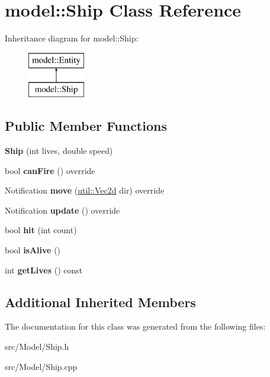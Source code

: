 \hypertarget{classmodel_1_1_ship}{}\section{model\+:\+:Ship Class Reference}
\label{classmodel_1_1_ship}
Inheritance diagram for model\+:\+:Ship\+:\begin{figure}[H]
\begin{center}
\leavevmode
\includegraphics[height=2.000000cm]{d4/d26/classmodel_1_1_ship}
\end{center}
\end{figure}
\subsection*{Public Member Functions}
\begin{DoxyCompactItemize}
\item 
\mbox{\label{classmodel_1_1_ship_ac81fa3e3e9c7e200adeb065ff4f02897}} 
{\bfseries Ship} (int lives, double speed)
\item 
\mbox{\label{classmodel_1_1_ship_a2ee9e5ff45ede55050a194762185a316}} 
bool {\bfseries can\+Fire} () override
\item 
\mbox{\label{classmodel_1_1_ship_ac176e59e40b53bbfd9d19ce23f65dee4}} 
Notification {\bfseries move} (\mbox{\hyperlink{classutil_1_1_vec2}{util\+::\+Vec2d}} dir) override
\item 
\mbox{\label{classmodel_1_1_ship_a2912180cd7f2614e849ef3bb4b66bfa7}} 
Notification {\bfseries update} () override
\item 
\mbox{\label{classmodel_1_1_ship_aefe6d4c2867b747ca49054fc15bcba04}} 
bool {\bfseries hit} (int count)
\item 
\mbox{\label{classmodel_1_1_ship_a4ae2593b0cf5097f3dbe21614db0a786}} 
bool {\bfseries is\+Alive} ()
\item 
\mbox{\label{classmodel_1_1_ship_af3db58f8c4350172e11cd79030ae4ca8}} 
int {\bfseries get\+Lives} () const
\end{DoxyCompactItemize}
\subsection*{Additional Inherited Members}


The documentation for this class was generated from the following files\+:\begin{DoxyCompactItemize}
\item 
src/\+Model/Ship.\+h\item 
src/\+Model/Ship.\+cpp\end{DoxyCompactItemize}
